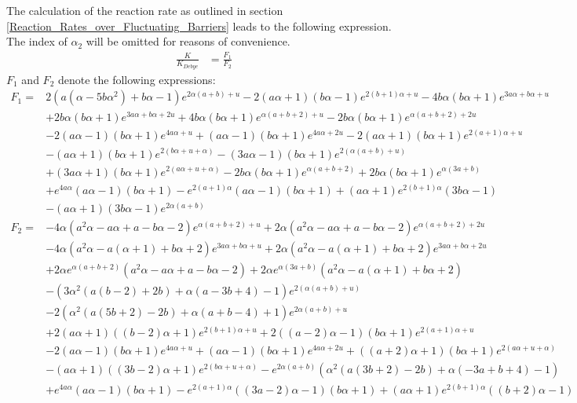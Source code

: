 The calculation of the reaction rate as outlined in section \ref{Reaction_Rates_over_Fluctuating_Barriers} leads to the following expression. The index of $\alpha_2$ will be omitted for reasons of convenience.
\begin{align}
    \frac{K}{K_{Debye}} &= \frac{F_1}{F_2}
    \label{two_state_rate}
\end{align}
$F_1$ and $F_2$ denote the following expressions:
\begin{align*}
    F_1 =& 2 \left(a \left(\alpha-5 b \alpha^2\right)+b \alpha-1\right) e^{2 \alpha (a+b)+u}-2 (a \alpha+1) (b \alpha-1) e^{2 (b+1) \alpha+u}-4 b \alpha (b \alpha+1) e^{3 a \alpha+b \alpha+u} \\
    &+2 b \alpha (b \alpha+1) e^{3 a \alpha+b \alpha+2 u}+4 b \alpha (b \alpha+1) e^{\alpha (a+b+2)+u}-2 b \alpha (b \alpha+1) e^{\alpha (a+b+2)+2 u} \\
    &-2 (a \alpha-1) (b \alpha+1) e^{4 a \alpha+u}+(a \alpha-1) (b \alpha+1) e^{4 a \alpha+2 u}-2 (a \alpha+1) (b \alpha+1) e^{2 (a+1) \alpha+u} \\
    &-(a \alpha+1) (b \alpha+1) e^{2 (b \alpha+u+\alpha)}-(3 a \alpha-1) (b \alpha+1) e^{2 (\alpha (a+b)+u)} \\
    &+(3 a \alpha+1) (b \alpha+1) e^{2 (a \alpha+u+\alpha)}-2 b \alpha (b \alpha+1) e^{\alpha (a+b+2)}+2 b \alpha (b \alpha+1) e^{\alpha (3 a+b)} \\
    &+e^{4 a \alpha} (a \alpha-1) (b \alpha+1)-e^{2 (a+1) \alpha} (a \alpha-1) (b \alpha+1)+(a \alpha+1) e^{2 (b+1) \alpha} (3 b \alpha-1) \\
    &-(a \alpha+1) (3 b \alpha-1) e^{2 \alpha (a+b)} \\
    F_2 =& -4 \alpha \left(a^2 \alpha-a \alpha+a-b \alpha-2\right) e^{\alpha (a+b+2)+u}+2 \alpha \left(a^2 \alpha-a \alpha+a-b \alpha-2\right) e^{\alpha (a+b+2)+2 u} \\
    &-4 \alpha \left(a^2 \alpha-a (\alpha+1)+b \alpha+2\right) e^{3 a \alpha+b \alpha+u}+2 \alpha \left(a^2 \alpha-a (\alpha+1)+b \alpha+2\right) e^{3 a \alpha+b \alpha+2 u} \\
    &+2 \alpha e^{\alpha (a+b+2)} \left(a^2 \alpha-a \alpha+a-b \alpha-2\right)+2 \alpha e^{\alpha (3 a+b)} \left(a^2 \alpha-a (\alpha+1)+b \alpha+2\right) \\
    &-\left(3 \alpha^2 (a (b-2)+2 b)+\alpha (a-3 b+4)-1\right) e^{2 (\alpha (a+b)+u)} \\
    &-2 \left(\alpha^2 (a (5 b+2)-2 b)+\alpha (a+b-4)+1\right) e^{2 \alpha (a+b)+u} \\
    &+2 (a \alpha+1) ((b-2) \alpha+1) e^{2 (b+1) \alpha+u}+2 ((a-2) \alpha-1) (b \alpha+1) e^{2 (a+1) \alpha+u} \\
    &-2 (a \alpha-1) (b \alpha+1) e^{4 a \alpha+u}+(a \alpha-1) (b \alpha+1) e^{4 a \alpha+2 u}+((a+2) \alpha+1) (b \alpha+1) e^{2 (a \alpha+u+\alpha)} \\
    &-(a \alpha+1) ((3 b-2) \alpha+1) e^{2 (b \alpha+u+\alpha)}-e^{2 \alpha (a+b)} \left(\alpha^2 (a (3 b+2)-2 b)+\alpha (-3 a+b+4)-1\right) \\
    &+e^{4 a \alpha} (a \alpha-1) (b \alpha+1)-e^{2 (a+1) \alpha} ((3 a-2) \alpha-1) (b \alpha+1)+(a \alpha+1) e^{2 (b+1) \alpha} ((b+2) \alpha-1)
\end{align*}

